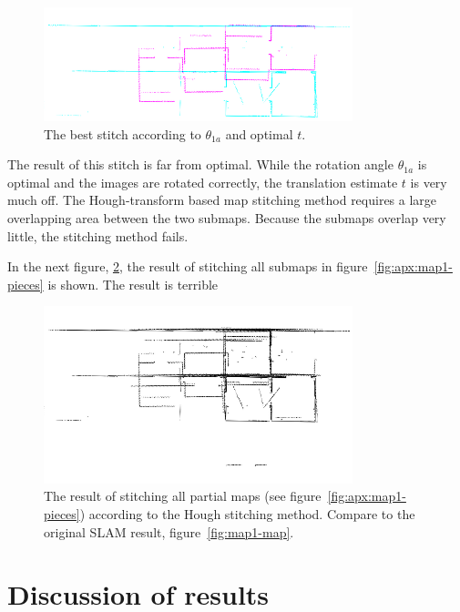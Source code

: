 \begin{figure}[ht]
  \centering
  \includegraphics[width=0.8\textwidth]{images/experiment/map1/stitch1-1a-result.png}
  \caption{The best stitch according to $\theta_{1a}$ and optimal $t$.}
  \label{fig:exp:1:result1}
\end{figure}

The result of this stitch is far from optimal. While the rotation angle $\theta_{1a}$ is optimal and the images are rotated correctly, the translation estimate $t$ is very much off. The Hough-transform based map stitching method requires a large overlapping area between the two submaps. Because the submaps overlap very little, the stitching method fails.

In the next figure, \ref{fig:exp:1:result8}, the result of stitching all submaps in figure~\ref{fig:apx:map1-pieces} is shown. The result is terrible

\begin{figure}[ht]
  \centering
  \includegraphics[width=0.8\textwidth]{images/experiment/map1/result/step8.png}
  \caption{The result of stitching all partial maps (see figure~\ref{fig:apx:map1-pieces}) according to the Hough stitching method. Compare to the original SLAM result, figure~\ref{fig:map1-map}.}
  \label{fig:exp:1:result8}
\end{figure}

\section{Discussion of results}